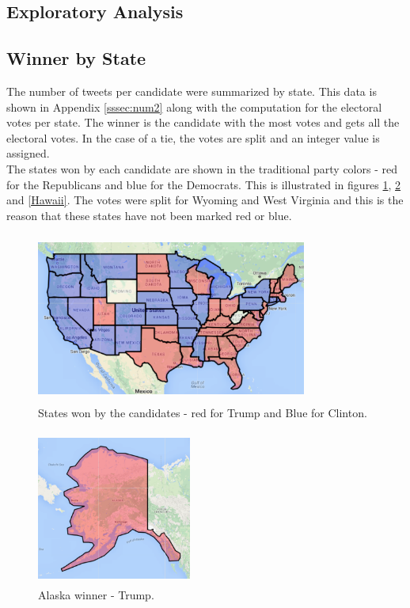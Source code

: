 \documentclass{sig-alternate-05-2015}
\begin{document}
\subsection{Exploratory Analysis}
\subsection{Winner by State}
The number of tweets per candidate were summarized by state. This data is shown in Appendix \ref{sssec:num2}  along with the computation for the electoral votes per state. The winner is the candidate with the most votes and gets all the electoral votes. In the case of a tie, the votes are split and an integer value is assigned.\\

The states won by each candidate are shown in the traditional party colors - red for the Republicans and blue for the Democrats. This is illustrated in figures \ref{ContinentalUs}, \ref{Alaska} and \ref{Hawaii}. The votes were split for Wyoming and West Virginia and this is the reason that these states have not been marked red or blue.\\

\begin{figure}
\centering
\includegraphics[width=3.5in, height=2.2in]{ContinentalUs.png}
\caption{States won by the candidates - red for Trump and Blue for Clinton.}
\label{ContinentalUs}
\end{figure}

\begin{figure}
\centering
\includegraphics[width=2in, height=2in]{Alaska.png}
\caption{Alaska winner - Trump.}
\label{Alaska}
\end{figure}
\end{document}
